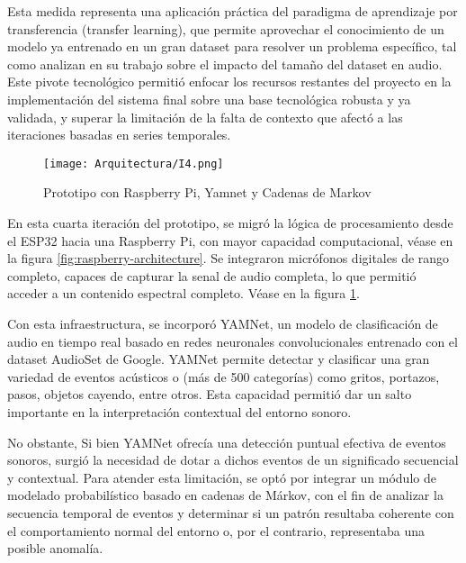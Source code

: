 Esta medida representa una aplicación práctica del paradigma de aprendizaje por transferencia (transfer learning), que permite aprovechar el conocimiento de un modelo ya entrenado en un gran dataset para resolver un problema específico, tal como analizan \citeauthor{pons2019deep} \citeyear{pons2019deep} en su trabajo sobre el impacto del tamaño del dataset en audio. Este pivote tecnológico permitió enfocar los recursos restantes del proyecto en la implementación del sistema final sobre una base tecnológica robusta y ya validada, y superar la limitación de la falta de contexto que afectó a las iteraciones basadas en series temporales.


      \begin{figure}[ht!]
            \centering
            \texttt{[image: Arquitectura/I4.png]}
            \caption{Prototipo con Raspberry Pi, Yamnet y Cadenas de Markov}
            \label{fig:prototipo4}
      \end{figure}

      En esta cuarta iteración del prototipo, se migró la lógica de procesamiento desde el ESP32 hacia una Raspberry Pi, con mayor capacidad computacional, véase en la figura \ref{fig:raspberry-architecture}. Se integraron micrófonos digitales de rango completo, capaces de capturar la senal de audio completa, lo que permitió acceder a un contenido espectral  completo. Véase en la figura \ref{fig:prototipo4}.

      Con esta infraestructura, se incorporó YAMNet, un modelo de clasificación de audio en tiempo real basado en redes neuronales convolucionales entrenado con el dataset AudioSet de Google. YAMNet permite detectar y clasificar una gran variedad de eventos acústicos o (más de 500 categorías) como gritos, portazos, pasos, objetos cayendo, entre otros. Esta capacidad permitió dar un salto importante en la interpretación contextual del entorno sonoro.

      No obstante, Si bien YAMNet ofrecía una detección puntual efectiva de eventos sonoros, surgió la necesidad de dotar a dichos eventos de un significado secuencial y contextual. Para atender esta limitación, se optó por integrar un módulo de modelado probabilístico basado en cadenas de Márkov, con el fin de analizar la secuencia temporal de eventos y determinar si un patrón resultaba coherente con el comportamiento normal del entorno o, por el contrario, representaba una posible anomalía.

